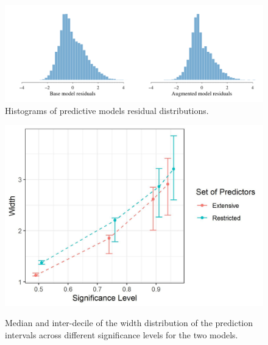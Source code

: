 \documentclass[10pt]{amsart}%
\begin{document}
\begin{center}
\begin{figure}[h]
  \includegraphics[width=\linewidth]{Figures/residuals}
  \caption{Histograms of predictive models residual distributions.}
\end{figure}
\end{center}




\begin{figure}[htbp]
	\centering
	\caption{Median and inter-decile of the width distribution of the prediction intervals across different significance levels for the two models.}
	\includegraphics[width=0.9\linewidth]{conformal.jpeg}
	\label{fig:conformal}
\end{figure}




\end{document}
